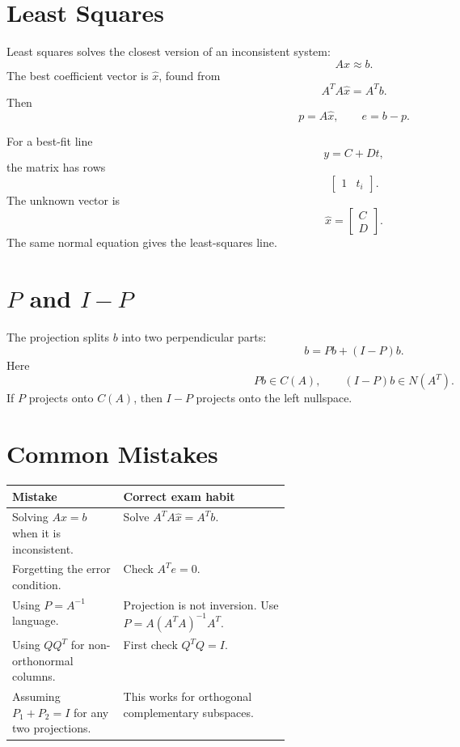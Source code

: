 \documentclass[10pt]{article}
\begin{document}
\section{Least Squares}

Least squares solves the closest version of an inconsistent system:
\[
Ax\approx b.
\]
The best coefficient vector is \(\hat{x}\), found from
\[
A^{T}A\hat{x}=A^{T}b.
\]
Then
\[
p=A\hat{x},
\qquad
e=b-p.
\]

For a best-fit line
\[
y=C+Dt,
\]
the matrix has rows
\[
\begin{bmatrix}1&t_i\end{bmatrix}.
\]
The unknown vector is
\[
\hat{x}=
\begin{bmatrix}
C\\
D
\end{bmatrix}.
\]
The same normal equation gives the least-squares line.

\section{\(P\) and \(I-P\)}

The projection splits \(b\) into two perpendicular parts:
\[
b=Pb+(I-P)b.
\]
Here
\[
Pb\in C(A),
\qquad
(I-P)b\in N(A^{T}).
\]
If \(P\) projects onto \(C(A)\), then \(I-P\) projects onto the left nullspace.


\section{Common Mistakes}

\begin{center}
\small
\begin{tabularx}{\linewidth}{@{}L{0.40\linewidth}Y@{}}
\toprule
Mistake & Correct exam habit \\
\midrule
Solving \(Ax=b\) when it is inconsistent. & Solve \(A^{T}A\hat{x}=A^{T}b\). \\
Forgetting the error condition. & Check \(A^{T}e=0\). \\
Using \(P=A^{-1}\) language. & Projection is not inversion. Use \(P=A(A^{T}A)^{-1}A^{T}\). \\
Using \(QQ^{T}\) for non-orthonormal columns. & First check \(Q^{T}Q=I\). \\
Assuming \(P_1+P_2=I\) for any two projections. & This works for orthogonal complementary subspaces. \\
\bottomrule
\end{tabularx}
\end{center}
\end{document}

